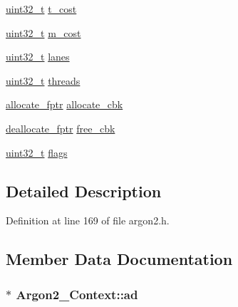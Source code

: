 \begin{DoxyCompactItemize}
\item 
\hyperlink{stdint_8h_a435d1572bf3f880d55459d9805097f62}{uint32\+\_\+t} \hyperlink{struct_argon2___context_adffe97f0527779835c511385dfc5d63d}{t\+\_\+cost}
\item 
\hyperlink{stdint_8h_a435d1572bf3f880d55459d9805097f62}{uint32\+\_\+t} \hyperlink{struct_argon2___context_a78b6d500cdb208f3b09a10c07716d6ab}{m\+\_\+cost}
\item 
\hyperlink{stdint_8h_a435d1572bf3f880d55459d9805097f62}{uint32\+\_\+t} \hyperlink{struct_argon2___context_a8ab1ecf163c039d8db1d9eeb119b6112}{lanes}
\item 
\hyperlink{stdint_8h_a435d1572bf3f880d55459d9805097f62}{uint32\+\_\+t} \hyperlink{struct_argon2___context_a1efec02e4fd164068c7e77ec5f8b5b01}{threads}
\item 
\hyperlink{argon2_8h_a5508e39cdab4199bc5b983d0f4e23b2a}{allocate\+\_\+fptr} \hyperlink{struct_argon2___context_aee437e28f004ff3e4a0ea15a7526bf63}{allocate\+\_\+cbk}
\item 
\hyperlink{argon2_8h_acd642781ec68bbc18647b67f19c15128}{deallocate\+\_\+fptr} \hyperlink{struct_argon2___context_a496ae30b7ad3db25e1a1ef1fbf98ce0b}{free\+\_\+cbk}
\item 
\hyperlink{stdint_8h_a435d1572bf3f880d55459d9805097f62}{uint32\+\_\+t} \hyperlink{struct_argon2___context_a17f2c93463a2d9c0f6017b2d843c6d0c}{flags}
\end{DoxyCompactItemize}


\subsection{Detailed Description}


Definition at line 169 of file argon2.\+h.



\subsection{Member Data Documentation}
\hypertarget{struct_argon2___context_a20329e319449d710c4f5bf591690b4c4}{}
\subsubsection[{ad}]{$\ast$ Argon2\+\_\+\+Context\+::ad}\label{struct_argon2___context_a20329e319449d710c4f5bf591690b4c4}


